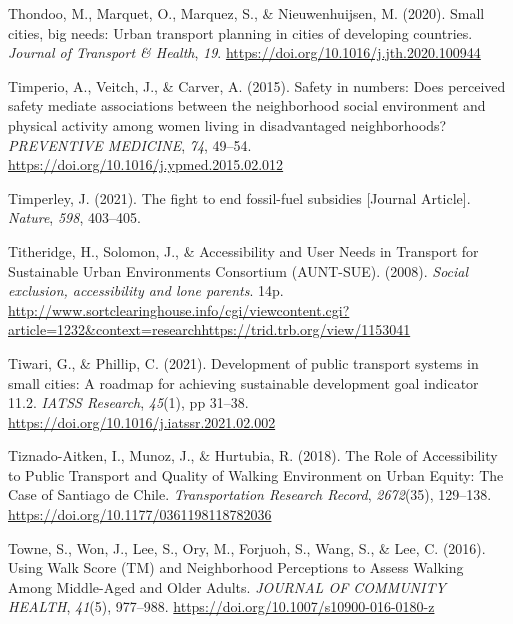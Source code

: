 \documentclass[
  letterpaper,
  DIV=11,
  numbers=noendperiod]{scrartcl}
\newlength{\cslhangindent}
\newenvironment{CSLReferences}[2] %
 {\begin{list}{}{%
  \setlength{\itemindent}{0pt}
  \setlength{\leftmargin}{0pt}
  \setlength{\parsep}{0pt}
  \ifodd #1
   \setlength{\leftmargin}{\cslhangindent}
   \setlength{\itemindent}{-1\cslhangindent}
  \fi
  \setlength{\itemsep}{#2\baselineskip}}}
 {\end{list}}
\begin{document}
\begin{CSLReferences}{1}{0}
Thondoo, M., Marquet, O., Marquez, S., \& Nieuwenhuijsen, M. (2020).
Small cities, big needs: {Urban} transport planning in cities of
developing countries. \emph{Journal of Transport \& Health}, \emph{19}.
\url{https://doi.org/10.1016/j.jth.2020.100944}

Timperio, A., Veitch, J., \& Carver, A. (2015). Safety in numbers:
{Does} perceived safety mediate associations between the neighborhood
social environment and physical activity among women living in
disadvantaged neighborhoods? \emph{PREVENTIVE MEDICINE}, \emph{74},
49--54. \url{https://doi.org/10.1016/j.ypmed.2015.02.012}

Timperley, J. (2021). The fight to end fossil-fuel subsidies {[}Journal
Article{]}. \emph{Nature}, \emph{598}, 403--405.

Titheridge, H., Solomon, J., \& Accessibility and User Needs in
Transport for Sustainable Urban Environments Consortium (AUNT-SUE).
(2008). \emph{Social exclusion, accessibility and lone parents}. 14p.
\url{http://www.sortclearinghouse.info/cgi/viewcontent.cgi?article=1232&context=researchhttps://trid.trb.org/view/1153041}

Tiwari, G., \& Phillip, C. (2021). Development of public transport
systems in small cities: {A} roadmap for achieving sustainable
development goal indicator 11.2. \emph{IATSS Research}, \emph{45}(1), pp
31--38. \url{https://doi.org/10.1016/j.iatssr.2021.02.002}

Tiznado-Aitken, I., Munoz, J., \& Hurtubia, R. (2018). The {Role} of
{Accessibility} to {Public Transport} and {Quality} of {Walking
Environment} on {Urban Equity}: {The Case} of {Santiago} de {Chile}.
\emph{Transportation Research Record}, \emph{2672}(35), 129--138.
\url{https://doi.org/10.1177/0361198118782036}

Towne, S., Won, J., Lee, S., Ory, M., Forjuoh, S., Wang, S., \& Lee, C.
(2016). Using {Walk Score} ({TM}) and {Neighborhood Perceptions} to
{Assess Walking Among Middle-Aged} and {Older Adults}. \emph{JOURNAL OF
COMMUNITY HEALTH}, \emph{41}(5), 977--988.
\url{https://doi.org/10.1007/s10900-016-0180-z}


\end{CSLReferences}
\end{document}

